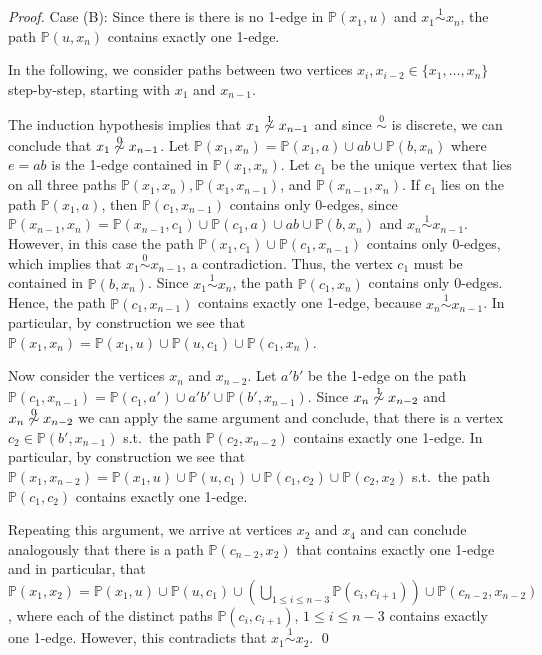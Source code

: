 \documentclass[smallextended]{svjour3}
\newcommand{\Ro}{\mathrel{\overset{0}{\sim}}}
\newcommand{\Rl}{\mathrel{\overset{1}{\sim}}}
\begin{document}
\begin{proof}
  \smallskip Case (B): Since there is there is no 1-edge in
  $\mathbb{P}(x_1,u)$ and $x_1\Rl x_n$, the path $\mathbb{P}(u,x_n)$
  contains exactly one 1-edge.

  In the following, we consider paths between two vertices $x_i, x_{i-2}
  \in \{x_1,\dots,x_n\}$ step-by-step, starting with $x_1$ and $x_{n-1}$.

  The induction hypothesis implies that $x_1\not \Rl x_{n-1}$ and since $\Ro$
  is discrete, we can conclude that $x_1\not \Ro x_{n-1}$.  Let
  $\mathbb{P}(x_1,x_n) = \mathbb{P}(x_1,a)\cup ab \cup \mathbb{P}(b,x_n)$
  where $e=ab$ is the 1-edge contained in $\mathbb{P}(x_1,x_n)$.  Let $c_1$
  be the unique vertex that lies on all three paths $\mathbb{P}(x_1,x_n),
  \mathbb{P}(x_1,x_{n-1})$, and $\mathbb{P}(x_{n-1},x_n)$.  If $c_1$ lies
  on the path $\mathbb{P}(x_1,a)$, then $\mathbb{P}(c_1,x_{n-1})$ contains
  only 0-edges, since $\mathbb{P}(x_{n-1},x_n) =
  \mathbb{P}(x_{n-1},c_1)\cup \mathbb{P}(c_1,a)\cup ab \cup
  \mathbb{P}(b,x_n)$ and $x_n \Rl x_{n-1}$. However, in this case the path
  $\mathbb{P}(x_{1},c_1)\cup\mathbb{P}(c_1, x_{n-1})$ contains only
  0-edges, which implies that $x_1\Ro x_{n-1}$, a contradiction.  Thus, the
  vertex $c_1$ must be contained in $\mathbb{P}(b,x_n)$.  Since $x_1\Rl
  x_n$, the path $\mathbb{P}(c_1,x_n)$ contains only 0-edges.  Hence, the
  path $\mathbb{P}(c_1,x_{n-1})$ contains exactly one 1-edge, because $x_n
  \Rl x_{n-1}$. In particular, by construction we see that
  $\mathbb{P}(x_1,x_n) = \mathbb{P}(x_1,u)\cup
  \mathbb{P}(u,c_1)\cup\mathbb{P}(c_1,x_n)$.

  Now consider the vertices $x_n$ and $x_{n-2}$. Let $a'b'$ be the 1-edge
  on the path $\mathbb{P}(c_1,x_{n-1}) = \mathbb{P}(c_1,a') \cup a'b' \cup
  \mathbb{P}(b',x_{n-1})$.  Since $x_{n}\not \Rl x_{n-2}$ and $x_{n}\not
  \Ro x_{n-2}$ we can apply the same argument and conclude, that there is a
  vertex $c_2\in \mathbb{P}(b',x_{n-1})$ s.t.\ the path
  $\mathbb{P}(c_2,x_{n-2})$ contains exactly one 1-edge.  In particular, by
  construction we see that $\mathbb{P}(x_1,x_{n-2}) = \mathbb{P}(x_1,u)\cup
  \mathbb{P}(u,c_1)\cup \mathbb{P}(c_1,c_2) \cup\mathbb{P}(c_2,x_{2})$
  s.t.\ the path $\mathbb{P}(c_1,c_2)$ contains exactly one 1-edge.

  Repeating this argument, we arrive at vertices $x_2$ and $x_4$ and can
  conclude analogously that there is a path $\mathbb{P}(c_{n-2},x_2)$ that
  contains exactly one 1-edge and in particular, that $\mathbb{P}(x_1,x_2)
  = \mathbb{P}(x_1,u)\cup \mathbb{P}(u,c_1)\cup \left(\bigcup_{1\leq i\leq
      n-3}\mathbb{P}(c_i,c_{i+1})\right) \cup\mathbb{P}(c_{n-2},x_{n-2})$,
  where each of the distinct paths $\mathbb{P}(c_i,c_{i+1})$, $1\leq i\leq
  n-3$ contains exactly one 1-edge.  However, this contradicts that $x_1\Rl
  x_2$.  
  \qed
\end{proof}
\end{document}
